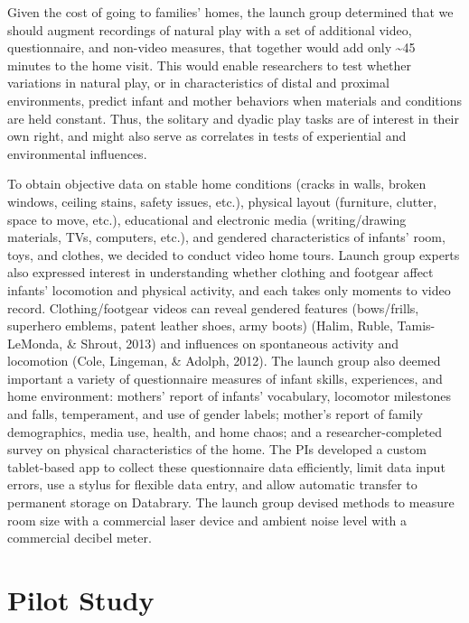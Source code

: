 \documentclass[english,man]{apa6}
\theoremstyle{definition}
\theoremstyle{definition}
\theoremstyle{definition}
\theoremstyle{remark}
\begin{document}
Given the cost of going to families' homes, the launch group determined
that we should augment recordings of natural play with a set of
additional video, questionnaire, and non-video measures, that together
would add only \textasciitilde{}45 minutes to the home visit. This would
enable researchers to test whether variations in natural play, or in
characteristics of distal and proximal environments, predict infant and
mother behaviors when materials and conditions are held constant. Thus,
the solitary and dyadic play tasks are of interest in their own right,
and might also serve as correlates in tests of experiential and
environmental influences.

To obtain objective data on stable home conditions (cracks in walls,
broken windows, ceiling stains, safety issues, etc.), physical layout
(furniture, clutter, space to move, etc.), educational and electronic
media (writing/drawing materials, TVs, computers, etc.), and gendered
characteristics of infants' room, toys, and clothes, we decided to
conduct video home tours. Launch group experts also expressed interest
in understanding whether clothing and footgear affect infants'
locomotion and physical activity, and each takes only moments to video
record. Clothing/footgear videos can reveal gendered features
(bows/frills, superhero emblems, patent leather shoes, army boots)
(Halim, Ruble, Tamis-LeMonda, \& Shrout, 2013) and influences on
spontaneous activity and locomotion (Cole, Lingeman, \& Adolph, 2012).
The launch group also deemed important a variety of questionnaire
measures of infant skills, experiences, and home environment: mothers'
report of infants' vocabulary, locomotor milestones and falls,
temperament, and use of gender labels; mother's report of family
demographics, media use, health, and home chaos; and a
researcher-completed survey on physical characteristics of the home. The
PIs developed a custom tablet-based app to collect these questionnaire
data efficiently, limit data input errors, use a stylus for flexible
data entry, and allow automatic transfer to permanent storage on
Databrary. The launch group devised methods to measure room size with a
commercial laser device and ambient noise level with a commercial
decibel meter.

\section{Pilot Study}\label{pilot-study}
\end{document}
